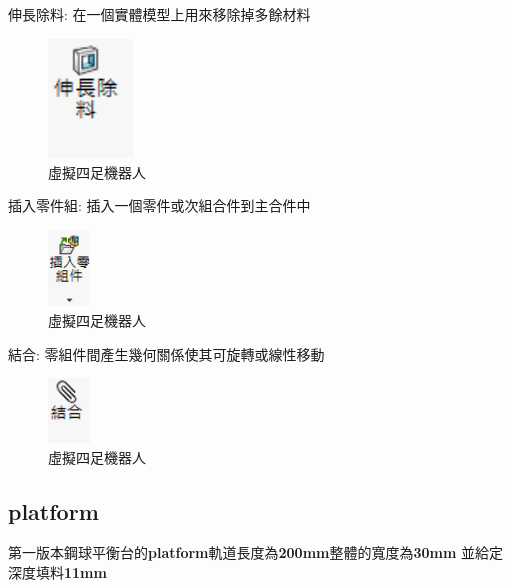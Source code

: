 \noindent 伸長除料: 在一個實體模型上用來移除掉多餘材料

\begin{figure}[h!]
    \centering
    \includegraphics[width=0.2\textwidth]{./../images/6-1-8.png}
    \caption{\Large 虛擬四足機器人}
\end{figure}

\noindent 插入零件組: 插入一個零件或次組合件到主合件中

\begin{figure}[h!]
    \centering
    \includegraphics[width=0.1\textwidth]{./../images/6-1-9.png}
    \caption{\Large 虛擬四足機器人}
\end{figure}

\noindent 結合: 零組件間產生幾何關係使其可旋轉或線性移動

\begin{figure}[h!]
    \centering
    \includegraphics[width=0.1\textwidth]{./../images/6-1-10.png}
    \caption{\Large 虛擬四足機器人}
\end{figure}

\subsection{platform}
第一版本鋼球平衡台的\textbf{platform}軌道長度為\textbf{200mm}整體的寬度為\textbf{30mm} 並給定深度填料\textbf{11mm}

